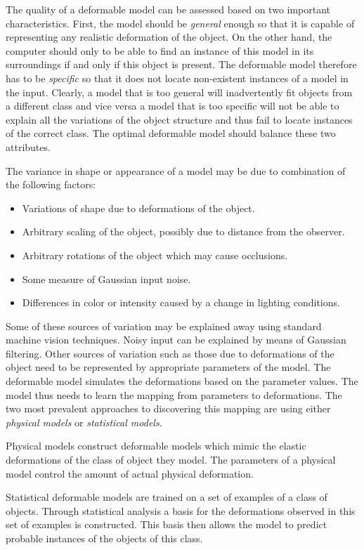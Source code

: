 \documentclass[11pt,a4paper]{report}
\begin{document}
The quality of a deformable model can be assessed based on two important
characteristics. First, the model should be \textit{general} enough so that it
is capable of representing any realistic deformation of the object.
On the other hand, the computer should only to be able to find an instance of this
model in its surroundings if and only if this object is present. The deformable model
therefore has to be \textit{specific} so that it does not locate non-existent
instances of a model in the input. Clearly, a model that is too general will inadvertently fit objects from a
different class and vice versa a model that is too specific will not be able to
explain all the variations of the object structure and thus fail to locate
instances of the correct class. The optimal deformable model should balance these two
attributes.

The variance in shape or appearance of a model may be due to combination of the following
factors:
\begin{itemize}
\item Variations of shape due to deformations of the object.
\item Arbitrary scaling of the object, possibly due to distance from the observer.
\item Arbitrary rotations of the object which may cause occlusions. 
\item Some measure of Gaussian input noise.
\item Differences in color or intensity caused by a change in lighting conditions.
\end{itemize}
Some of these sources of variation may be explained away using standard machine
vision techniques. Noisy input can be explained by means of Gaussian
filtering. Other sources of variation such as those due to deformations of the
object need to be represented by appropriate parameters of the model. The
deformable model simulates the deformations based on the parameter values. The
model thus needs to learn the mapping from parameters to deformations. The two
most prevalent approaches to discovering this mapping are using either \textit{physical
models} or \textit{statistical models}.

Physical models construct deformable models which mimic the elastic deformations
of the class of object they model. The parameters of a physical model control the amount
of actual physical deformation.

Statistical deformable models are trained on a set of examples of a class of
objects. Through statistical analysis a basis for the deformations observed in
this set of examples is constructed. This basis then allows the model to predict
probable instances of the objects of this class. 
\end{document}
